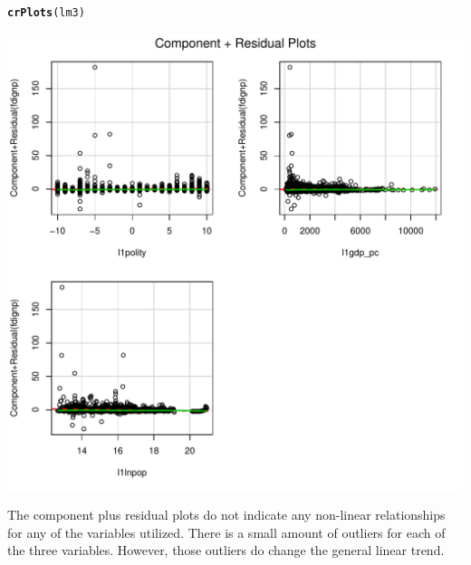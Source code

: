 \documentclass[12pt]{article}\usepackage[]{graphicx}\usepackage[]{color}
\makeatletter
\def\maxwidth{ %
  \ifdim\Gin@nat@width>\linewidth
    \linewidth
  \else
    \Gin@nat@width
  \fi
}
\newcommand{\hlstd}[1]{\textcolor[rgb]{0.345,0.345,0.345}{#1}}%
\newcommand{\hlkwd}[1]{\textcolor[rgb]{0.737,0.353,0.396}{\textbf{#1}}}%
\newenvironment{kframe}{%
 \def\at@end@of@kframe{}%
 \ifinner\ifhmode%
  \def\at@end@of@kframe{\end{minipage}}%
  \begin{minipage}{\columnwidth}%
 \fi\fi%
 \def\FrameCommand##1{\hskip\@totalleftmargin \hskip-\fboxsep
 \colorbox{shadecolor}{##1}\hskip-\fboxsep
     \hskip-\linewidth \hskip-\@totalleftmargin \hskip\columnwidth}%
 \MakeFramed {\advance\hsize-\width
   \@totalleftmargin\z@ \linewidth\hsize
   \@setminipage}}%
 {\par\unskip\endMakeFramed%
 \at@end@of@kframe}
\newenvironment{knitrout}{}{} %
\makeatother
\begin{document}
\begin{knitrout}
\begin{kframe}
{\ttfamily\noindent\itshape\color{messagecolor}{\#\# \\\#\# Attaching package: 'car'\\\#\# \\\#\# The following object is masked from 'package:boot':\\\#\# \\\#\#\ \ \ \  logit}}\begin{alltt}
\hlkwd{crPlots}\hlstd{(lm3)}
\end{alltt}
\end{kframe}
\includegraphics[width=\maxwidth]{figure/unnamed-chunk-5-1} 

\end{knitrout}

The component plus residual plots do not indicate any non-linear relationships for any of the variables utilized. There is a small amount of outliers for each of the three variables. However, those outliers do change the general linear trend.
\end{document}
